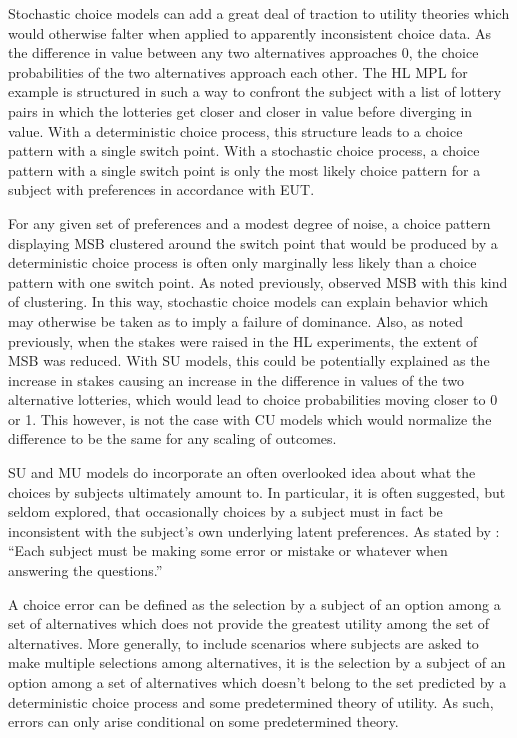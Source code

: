 \documentclass[../main.tex]{subfiles}
\begin{document}
Stochastic choice models can add a great deal of traction to utility theories which would otherwise falter when applied to apparently inconsistent choice data.
As the difference in value between any two alternatives approaches 0, the choice probabilities of the two alternatives approach each other.
The HL MPL for example is structured in such a way to confront the subject with a list of lottery pairs in which the lotteries get closer and closer in value before diverging in value.
With a deterministic choice process, this structure leads to a choice pattern with a single switch point.
With a stochastic choice process, a choice pattern with a single switch point is only the most likely choice pattern for a subject with preferences in accordance with EUT. 

For any given set of preferences and a modest degree of noise, a choice pattern displaying MSB clustered around the switch point that would be produced by a deterministic choice process is often only marginally less likely than a choice pattern with one switch point.
As noted previously, \textcite[1648]{Holt2002} observed MSB with this kind of clustering.
In this way, stochastic choice models can explain behavior which may otherwise be taken as to imply a failure of dominance.
Also, as noted previously, when the stakes were raised in the HL experiments, the extent of MSB was reduced.
With SU models, this could be potentially explained as the increase in stakes causing an increase in the difference in values of the two alternative lotteries, which would lead to choice probabilities moving closer to 0 or 1.
This however, is not the case with CU models which would normalize the difference to be the same for any scaling of outcomes.

SU and MU models do incorporate an often overlooked idea about what the choices by subjects ultimately amount to.
In particular, it is often suggested, but seldom explored, that occasionally choices by a subject must in fact be inconsistent with the subject's own underlying latent preferences.
As stated by \textcite{Holt1986}: \enquote{Each subject must be making some error or mistake or whatever when answering the questions.}

A choice error can be defined as the selection by a subject of an option among a set of alternatives which does not provide the greatest utility among the set of alternatives.
More generally, to include scenarios where subjects are asked to make multiple selections among alternatives, it is the selection by a subject of an option among a set of alternatives which doesn't belong to the set predicted by a deterministic choice process and some predetermined theory of utility.
As such, errors can only arise conditional on some predetermined theory.
\end{document}
